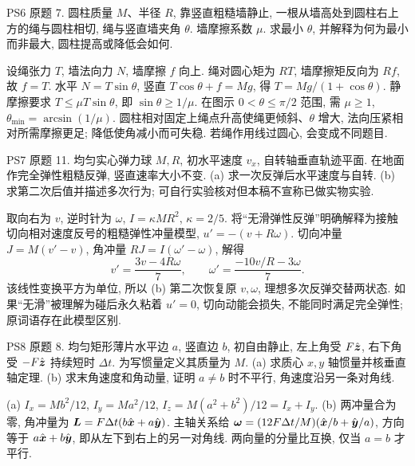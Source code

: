 \begin{exercise}
PS6 原题 7. 圆柱质量 $M$、半径 $R$, 靠竖直粗糙墙静止, 一根从墙高处到圆柱右上方的绳与圆柱相切, 绳与竖直墙夹角 $\theta$. 墙摩擦系数 $\mu$. 求最小 $\theta$, 并解释为何为最小而非最大, 圆柱提高或降低会如何.
\end{exercise}
\begin{solution}
设绳张力 $T$, 墙法向力 $N$, 墙摩擦 $f$ 向上. 绳对圆心矩为 $RT$, 墙摩擦矩反向为 $Rf$, 故 $f=T$. 水平 $N=T\sin\theta$, 竖直 $T\cos\theta+f=Mg$, 得 $T=Mg/(1+\cos\theta)$. 静摩擦要求 $T\le\mu T\sin\theta$, 即 $\sin\theta\ge1/\mu$. 在图示 $0<\theta\le\pi/2$ 范围, 需 $\mu\ge1$, $\theta_{\min}=\arcsin(1/\mu)$. 圆柱相对固定上绳点升高使绳更倾斜、$\theta$ 增大, 法向压紧相对所需摩擦更足; 降低使角减小而可失稳. 若绳作用线过圆心, 会变成不同题目.
\end{solution}
\begin{exercise}
PS7 原题 11. 均匀实心弹力球 $M,R$, 初水平速度 $v_x$, 自转轴垂直轨迹平面. 在地面作完全弹性粗糙反弹, 竖直速率大小不变. (a) 求一次反弹后水平速度与自转. (b) 求第二次后值并描述多次行为; 可自行实验核对但本稿不宣称已做实物实验.
\end{exercise}
\begin{solution}
取向右为 $v$, 逆时针为 $\omega$, $I=\kappa MR^2$, $\kappa=2/5$. 将“无滑弹性反弹”明确解释为接触切向相对速度反号的粗糙弹性冲量模型, $u'=-(v+R\omega)$. 切向冲量 $J=M(v'-v)$, 角冲量 $RJ=I(\omega'-\omega)$, 解得
\begin{equation}
v'=\frac{3v-4R\omega}{7},\qquad
\omega'=\frac{-10v/R-3\omega}{7}.
\end{equation}
该线性变换平方为单位, 所以 (b) 第二次恢复原 $v,\omega$, 理想多次反弹交替两状态. 如果“无滑”被理解为碰后永久粘着 $u'=0$, 切向动能会损失, 不能同时满足完全弹性; 原词语存在此模型区别.
\end{solution}
\begin{exercise}
PS8 原题 8. 均匀矩形薄片水平边 $a$, 竖直边 $b$, 初自由静止, 左上角受 $F\hat{\boldsymbol{z}}$, 右下角受 $-F\hat{\boldsymbol{z}}$ 持续短时 $\Delta t$. 为写惯量定义其质量为 $M$. (a) 求质心 $x,y$ 轴惯量并核垂直轴定理. (b) 求末角速度和角动量, 证明 $a\ne b$ 时不平行, 角速度沿另一条对角线.
\end{exercise}
\begin{solution}
(a) $I_x=Mb^2/12$, $I_y=Ma^2/12$, $I_z=M(a^2+b^2)/12=I_x+I_y$. (b) 两冲量合为零, 角冲量为 $\boldsymbol{L}=F\Delta t(b\hat{\boldsymbol{x}}+a\hat{\boldsymbol{y}})$. 主轴关系给 $\boldsymbol{\omega}=(12F\Delta t/M)(\hat{\boldsymbol{x}}/b+\hat{\boldsymbol{y}}/a)$, 方向等于 $a\hat{\boldsymbol{x}}+b\hat{\boldsymbol{y}}$, 即从左下到右上的另一对角线. 两向量的分量比互换, 仅当 $a=b$ 才平行.
\end{solution}
